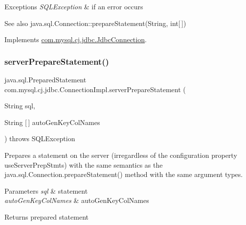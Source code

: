 \begin{DoxyExceptions}{Exceptions}
{\em S\+Q\+L\+Exception} & if an error occurs \\
\hline
\end{DoxyExceptions}
\begin{DoxySeeAlso}{See also}
java.\+sql.\+Connection\+::prepare\+Statement(\+String, int\mbox{[}$\,$\mbox{]}) 
\end{DoxySeeAlso}


Implements \mbox{\hyperlink{interfacecom_1_1mysql_1_1cj_1_1jdbc_1_1_jdbc_connection_aefdad3d71436ba1c80d2cb1e8419dfba}{com.\+mysql.\+cj.\+jdbc.\+Jdbc\+Connection}}.

\mbox{\label{classcom_1_1mysql_1_1cj_1_1jdbc_1_1_connection_impl_ae7caa7907c0b5245c5f8ac2f209abf2a}} 
\subsubsection{\texorpdfstring{server\+Prepare\+Statement()}{serverPrepareStatement()}\hspace{0.1cm}{\footnotesize\ttfamily [6/6]}}
{\footnotesize\ttfamily java.\+sql.\+Prepared\+Statement com.\+mysql.\+cj.\+jdbc.\+Connection\+Impl.\+server\+Prepare\+Statement (\begin{DoxyParamCaption}\item[{String}]{sql,  }\item[{String \mbox{[}$\,$\mbox{]}}]{auto\+Gen\+Key\+Col\+Names }\end{DoxyParamCaption}) throws S\+Q\+L\+Exception}

Prepares a statement on the server (irregardless of the configuration property \textquotesingle{}use\+Server\+Prep\+Stmts\textquotesingle{}) with the same semantics as the java.\+sql.\+Connection.\+prepare\+Statement() method with the same argument types.


\begin{DoxyParams}{Parameters}
{\em sql} & statement \\
\hline
{\em auto\+Gen\+Key\+Col\+Names} & auto\+Gen\+Key\+Col\+Names \\
\hline
\end{DoxyParams}
\begin{DoxyReturn}{Returns}
prepared statement 
\end{DoxyReturn}

